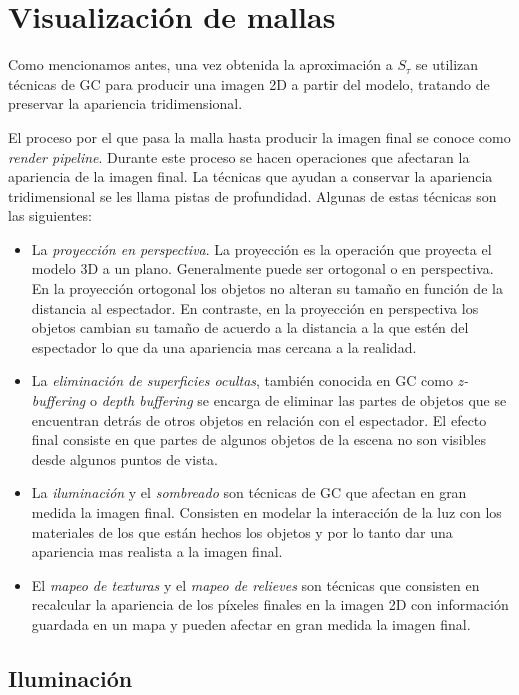 \section{Visualización de mallas}
\label{sec:visualizarMallas}
Como mencionamos antes, una vez obtenida la aproximación a $S_{\tau}$ se utilizan técnicas de GC para producir una imagen 2D a partir del modelo, tratando de preservar la apariencia tridimensional.

El proceso por el que pasa la malla hasta producir la imagen final se conoce como \emph{render pipeline}. Durante este proceso se hacen operaciones que afectaran la apariencia de la imagen final. La técnicas que ayudan a conservar la apariencia tridimensional se les llama pistas de profundidad. Algunas de estas técnicas son las siguientes:

\begin{itemize}
  \item La \emph{proyección en perspectiva}. La proyección es la operación que proyecta el modelo 3D a un plano. Generalmente puede ser ortogonal o en perspectiva. En la proyección ortogonal los objetos no alteran su tamaño en función de la distancia al espectador. En contraste, en la proyección en perspectiva los objetos cambian su tamaño de acuerdo a la distancia a la que estén del espectador lo que da una apariencia mas cercana a la realidad.
  \item La \emph{eliminación de superficies ocultas}, también conocida en GC como \emph{z-buffering} o \emph{depth buffering} se encarga de eliminar las partes de objetos que se encuentran detrás de otros objetos en relación con el espectador. El efecto final consiste en que partes de algunos objetos de la escena no son visibles desde algunos puntos de vista.
  \item La \emph{iluminación} y el \emph{sombreado} son técnicas de GC que afectan en gran medida la imagen final. Consisten en modelar la interacción de la luz con los materiales de los que están hechos los objetos y por lo tanto dar una apariencia mas realista a la imagen final.
  \item El \emph{mapeo de texturas} y el \emph{mapeo de relieves} son técnicas que consisten en recalcular la apariencia de los píxeles finales en la imagen 2D con información guardada en un mapa y pueden afectar en gran medida la imagen final.
\end{itemize}


\subsection{Iluminación}

